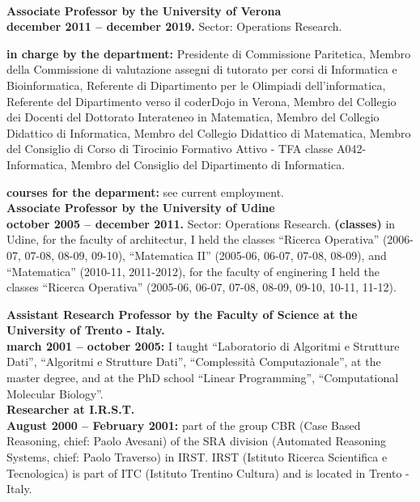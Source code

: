 \documentclass[10pt]{article}
\newcommand{\voice}[1] { \bigskip \medskip \noindent {\Large \bf #1} \medskip\\ }
\newcommand{\subvoice}[1] { {\large \bf #1} \smallskip\\ }
\begin{document}
\vspace{1.8mm}

\voice{{\LARGE Work Experience}}

\subvoice{Associate Professor by the University of Verona}
{\bf december 2011 -- december 2019.}
Sector: Operations Research.

{\bf in charge by the department:} Presidente di Commissione Paritetica, Membro della Commissione di valutazione assegni di tutorato per corsi di Informatica e Bioinformatica, Referente di Dipartimento per le Olimpiadi dell'informatica, Referente del Dipartimento verso il coderDojo in Verona, Membro del Collegio dei Docenti del Dottorato Interateneo in Matematica, Membro del Collegio Didattico di Informatica, Membro del Collegio Didattico di Matematica, Membro del Consiglio di Corso di Tirocinio Formativo Attivo - TFA classe A042- Informatica, Membro del Consiglio del Dipartimento di Informatica.

{\bf courses for the deparment:} see current employment.\\

\subvoice{Associate Professor by the University of Udine}
{\bf october 2005 -- december 2011.}
Sector: Operations Research.
{\bf (classes)} in Udine,
for the faculty of architectur,
I held the classes ``Ricerca Operativa'' (2006-07, 07-08, 08-09, 09-10), ``Matematica II'' (2005-06, 06-07, 07-08, 08-09),
and ``Matematica'' (2010-11, 2011-2012), for the faculty of enginering I held the classes ``Ricerca Operativa'' (2005-06, 06-07, 07-08, 08-09, 09-10, 10-11, 11-12).


\subvoice{Assistant Research Professor
          by the Faculty of Science
          at the University of Trento - Italy.}
{\bf march 2001 -- october 2005:}
I taught ``Laboratorio di Algoritmi e Strutture Dati'', ``Algoritmi e Strutture Dati'', ``Complessit\`a Computazionale'', at the master degree, and at the PhD school ``Linear Programming'', ``Computational Molecular Biology''.\\



\subvoice{Researcher at I.R.S.T.}
{\bf August 2000 -- February 2001:}
part of the group CBR (Case Based Reasoning, chief: Paolo Avesani)
of the SRA division
(Automated Reasoning Systems, chief: Paolo Traverso) in IRST.
IRST (Istituto Ricerca Scientifica e Tecnologica)
is part of ITC (Istituto Trentino Cultura)
and is located in Trento - Italy.\\
\end{document}
